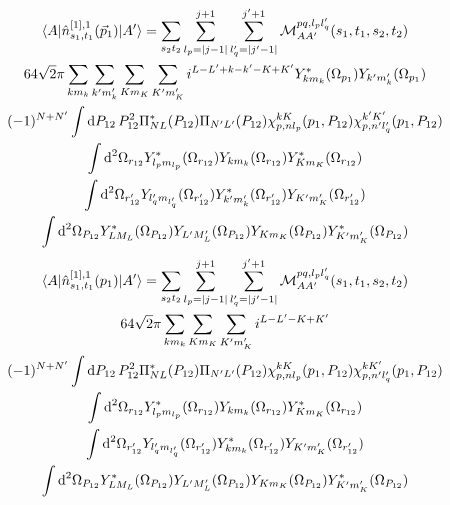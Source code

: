 \documentclass[10pt]{article}
\begin{document}
\begin{multline*}
\braket{ A | \hat{n}^{[1],1}_{s_1,t_1}(\vec{p}_1) | A'} = \sum_{s_2 t_2}  \sum_{l_p = |j-1|}^{j+1} \sum_{l_q' = |j' - 1|}^{j'+1} \mathcal{M}_{AA'}^{p q,l_p l_q'}(s_1,t_1,s_2,t_2) \\
64 \sqrt{2} \pi \sum_{k m_k} \sum_{k' m_k'} \sum_{K m_K} \sum_{K' m_K'} i^{L-L'+k-k'-K+K'} Y_{k m_k}^{*}(\Omega_{p_1}) Y_{k' m_k'}(\Omega_{p_1}) \\
 (-1)^{N+N'} \int \text{d} P_{12} \, P_{12}^{2} \Pi^{*}_{N L}(P_{12}) \Pi_{N' L'}(P_{12}) \chi_{p,nl_p}^{kK}(p_1,P_{12}) \chi_{p,n'l_q'}^{k'K'}(p_1,P_{12}) \\
 \int \text{d}^{2} \Omega_{r_{12}}  Y_{l_p m_{l_p} }^{*}(\Omega_{r_{12}}) Y_{k m_k}(\Omega_{r_{12}}) Y_{K m_K}^{*}(\Omega_{r_{12}}) \\
 \int \text{d}^{2} \Omega_{r_{12}'}  Y_{ l_q' m_{l_q'} }(\Omega_{r_{12}'})  Y_{k' m_k'}^{*}(\Omega_{r_{12}'}) Y_{K' m_K'}(\Omega_{r_{12}'}) \\
   \int \text{d}^{2} \Omega_{P_{12}}  Y_{L M_L}^{*}(\Omega_{P_{12}})  Y_{L' M_L'}(\Omega_{P_{12}}) Y_{K m_K}(\Omega_{P_{12}}) Y_{K' m_K'}^{*}(\Omega_{P_{12}})
\end{multline*}
\begin{multline*}
\braket{ A | \hat{n}^{[1],1}_{s_1,t_1}(p_1) | A'} = \sum_{s_2 t_2}  \sum_{l_p = |j-1|}^{j+1} \sum_{l_q' = |j' - 1|}^{j'+1} \mathcal{M}_{AA'}^{p q,l_p l_q'}(s_1,t_1,s_2,t_2) \\
64 \sqrt{2} \pi \sum_{k m_k} \sum_{K m_K} \sum_{K' m_K'} i^{L-L'-K+K'}  \\
 (-1)^{N+N'} \int \text{d} P_{12} \, P_{12}^{2} \Pi^{*}_{N L}(P_{12}) \Pi_{N' L'}(P_{12}) \chi_{p,nl_p}^{kK}(p_1,P_{12}) \chi_{p,n'l_q'}^{kK'}(p_1,P_{12}) \\
 \int \text{d}^{2} \Omega_{r_{12}}  Y_{l_p m_{l_p} }^{*}(\Omega_{r_{12}}) Y_{k m_k}(\Omega_{r_{12}}) Y_{K m_K}^{*}(\Omega_{r_{12}}) \\
 \int \text{d}^{2} \Omega_{r_{12}'}  Y_{ l_q' m_{l_q'} }(\Omega_{r_{12}'})  Y_{k m_k}^{*}(\Omega_{r_{12}'}) Y_{K' m_K'}(\Omega_{r_{12}'}) \\
   \int \text{d}^{2} \Omega_{P_{12}}  Y_{L M_L}^{*}(\Omega_{P_{12}})  Y_{L' M_L'}(\Omega_{P_{12}}) Y_{K m_K}(\Omega_{P_{12}}) Y_{K' m_K'}^{*}(\Omega_{P_{12}})
\end{multline*}
\end{document}
